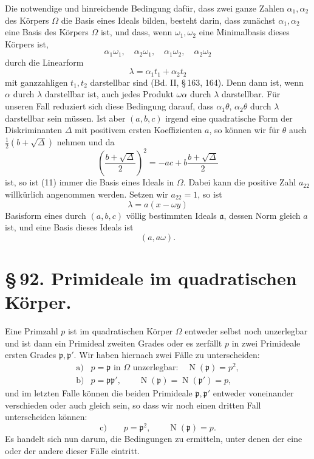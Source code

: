 \documentclass[11pt]{article}
\newcommand{\Norm}{\operatorname{N}}
\begin{document}
Die notwendige und hinreichende Bedingung dafür, dass zwei ganze Zahlen $\alpha_1,\alpha_2$ des Körpers $\Omega$ die Basis eines Ideals bilden, besteht darin, dass zunächst $\alpha_1,\alpha_2$ eine Basis des Körpers $\Omega$ ist, und dass, wenn $\omega_1,\omega_2$ eine Minimalbasis dieses Körpers ist,
\[
 \alpha_1\omega_1,
 \quad \alpha_2\omega_1,
 \quad \alpha_1\omega_2,
 \quad \alpha_2\omega_2
\]
durch die Linearform
\[
 \lambda=\alpha_1t_1+\alpha_2t_2
\]
mit ganzzahligen $t_1,t_2$ darstellbar sind (Bd. II, \S\,163, 164). Denn dann ist, wenn $\alpha$ durch $\lambda$ darstellbar ist, auch jedes Produkt $\omega\alpha$ durch $\lambda$ darstellbar. Für unseren Fall reduziert sich diese Bedingung darauf, dass $\alpha_1\theta$, $\alpha_2\theta$ durch $\lambda$ darstellbar sein müssen. Ist aber $(a,b,c)$ irgend eine quadratische Form der Diskriminanten $\Delta$ mit positivem ersten Koeffizienten $a$, so können wir für $\theta$ auch $\frac12(b+\sqrt\Delta)$ nehmen und da
\[
 \left(\frac{b+\sqrt\Delta}{2}\right)^2
   =-ac+b\frac{b+\sqrt\Delta}{2}
\]
ist, so ist (11) immer die Basis eines Ideals in $\Omega$. Dabei kann die positive Zahl $a_{22}$ willkürlich angenommen werden. Setzen wir $a_{22}=1$, so ist
\begin{equation}
 \lambda=a(x-\omega y)
\tag{15}
\end{equation}
Basisform eines durch $(a,b,c)$ völlig bestimmten Ideals $\mathfrak a$, dessen Norm gleich $a$ ist, und eine Basis dieses Ideals ist
\begin{equation}
 (a,a\omega).
\tag{16}
\end{equation}

\section*{\S\,92. Primideale im quadratischen Körper.}

Eine Primzahl $p$ ist im quadratischen Körper $\Omega$ entweder selbst noch unzerlegbar und ist dann ein Primideal zweiten Grades oder es zerfällt $p$ in zwei Primideale ersten Grades $\mathfrak p,\mathfrak p'$. Wir haben hiernach zwei Fälle zu unterscheiden:
\[
\begin{array}{ll}
\text{a)}& p=\mathfrak p \text{ in }\Omega\text{ unzerlegbar:}\quad \Norm(\mathfrak p)=p^2,\\[0.25em]
\text{b)}& p=\mathfrak p\mathfrak p',\qquad \Norm(\mathfrak p)=\Norm(\mathfrak p')=p,
\end{array}
\]
und im letzten Falle können die beiden Primideale $\mathfrak p,\mathfrak p'$ entweder voneinander verschieden oder auch gleich sein, so dass wir noch einen dritten Fall unterscheiden können:
\[
\text{c)}\qquad p=\mathfrak p^2,
\qquad \Norm(\mathfrak p)=p.
\]
Es handelt sich nun darum, die Bedingungen zu ermitteln, unter denen der eine oder der andere dieser Fälle eintritt.
\end{document}
